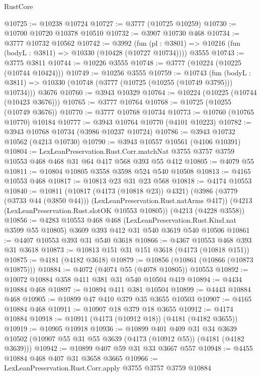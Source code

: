 \begin{lexlean}{RustCore}
\begin{coremodule}
@10725 := @10238 @10724
@10727 := @3777 (@10725 @10259)
@10730 := @10700 @10720 @10378 @10510
@10732 := @3907 @10730 @468
@10734 := @3777 @10732 @10562
@10742 := @3992
    (fun (pl : @3801) => @10216 (fun (bodyL : @3811) => @10330 (@10428 (@10727 @10734))))
    @3555
@10743 := @3775 @3811
@10744 := @10226 @3555
@10748 := @3777 (@10224 (@10225 (@10744 @10424)))
@10749 := @10256 @3555
@10759 := @10743
    (fun (bodyL : @3811) => @10330 (@10748 (@3777 (@10725 (@10255 (@10749 @3795))) @10734)))
    @3676
@10760 := @3943 @10329
@10764 := @10224 (@10225 (@10744 (@10423 @3676)))
@10765 := @3777 @10764
@10768 := @10725 (@10255 (@10749 @3676))
@10770 := @3777 @10768 @10734
@10773 := @10760 (@10765 @10770) @10184
@10777 := @3943 @10764 @10770 (@4101 @10223)
@10782 := @3943 @10768 @10734 (@3986 @10237 @10724)
@10786 := @3943 @10732 @10562 (@4213 @10730)
@10790 := @3943 @10557 @10561 (@4106 @10391)
@10804 := LexLeanPreservation.Rust.Corr.matchNat
    @3755
    @3757
    @3759
    @10553
    @468
    @468
    @31
    @64
    @417
    @568
    @393
    @55
    @412
@10805 := @4079 @55
@10811 := @10804 @10805 @3558 @3598 @524 @540 @10508
@10813 := @4165 @10553 @468
@10817 := @10813 @23 @31 @23 @568
@10818 := @4174 @10553
@10840 := @10811
    (@10817 (@4173 (@10818 @23)) @4321)
    (@3986 (@3779 (@3733 @44 (@3850 @44))) (LexLeanPreservation.Rust.natArms @417))
    (@4213 (LexLeanPreservation.Rust.slotOK @10553 @10805))
    (@4213 (@4228 @3558))
@10856 := @4283
    @10553
    @468
    @468
    (LexLeanPreservation.Rust.Kind.nat @3599 @55 @10805)
    @3609
    @393
    @412
    @31
    @540
    @3619
    @540
    @10506
@10861 := @4407 @10553 @393 @31 @540 @3618
@10866 := @4367 @10553 @468 @393 @31 @3618
@10873 := @10813 @151 @31 @151 @3618 (@4173 (@10818 @151))
@10875 := @4181 (@4182 @3618)
@10879 := @10856 (@10861 (@10866 (@10873 @10875)))
@10884 := @4072 (@4074 @55 (@4078 @10805)) @10553
@10892 := @10072 @10884 @358 @411 @381 @31 @540 @10504 @419
@10894 := @4434 @10884 @468
@10897 := @10894 @411 @381 @10504
@10899 := @4443 @10884 @468
@10905 := @10899 @47 @410 @379 @35 @3655 @10503
@10907 := @4165 @10884 @468
@10911 := @10907 @18 @379 @18 @3655
@10912 := @4174 @10884
@10918 := @10911 (@4173 (@10912 @18)) (@4181 (@4182 @3655))
@10919 := @10905 @10918
@10936 := @10899
    @401
    @409
    @31
    @34
    @3639
    @10502
    (@10907 @55 @31 @55 @3639 (@4173 (@10912 @55)) (@4181 (@4182 @3639)))
@10942 := @10899 @407 @59 @31 @33 @3667 @557
@10948 := @4455 @10884 @468 @407 @31 @3658 @3665
@10966 := LexLeanPreservation.Rust.Corr.apply
    @3755
    @3757
    @3759
    @10884

\end{coremodule}
\end{lexlean}
